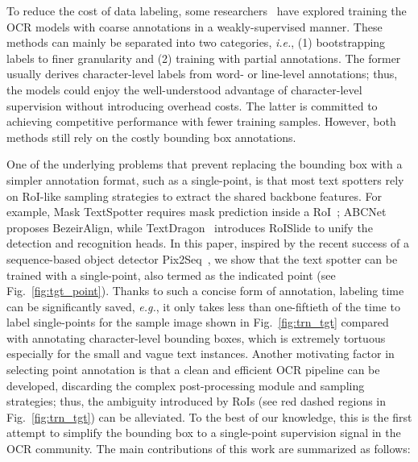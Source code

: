 \documentclass[sigconf]{acmart}
\begin{document}
To reduce the cost of data labeling, some researchers~\cite{tian2017wetext, bartz2018see, hu2017wordsup, baek2019character} have explored training the OCR models with coarse annotations in a weakly-supervised manner. These methods can mainly be separated into two categories, \emph{i.e.}, (1) bootstrapping labels to finer granularity and (2) training with partial annotations. The former usually derives character-level labels from word- or line-level annotations; thus, the models could enjoy the well-understood advantage of character-level supervision without introducing overhead costs. The latter is committed to achieving competitive performance with fewer training samples. However, both methods still rely on the costly bounding box annotations.

One of the underlying problems that prevent replacing the bounding box with a simpler annotation format, such as a single-point, is that most text spotters rely on RoI-like sampling strategies to extract the shared backbone features. For example, Mask TextSpotter requires mask prediction inside a RoI~\cite{liao2020masktext}; ABCNet~\cite{liu2020abcnet} proposes BezeirAlign, while TextDragon~\cite{feng2019textdragon} introduces RoISlide to unify the detection and recognition heads. In this paper, inspired by the recent success of a sequence-based object detector Pix2Seq~\cite{chen2021pix2seq}, we show that the text spotter can be trained with a single-point, also termed as the indicated point (see Fig.~\ref{fig:tgt_point}). Thanks to such a concise form of annotation, labeling time can be significantly saved, \emph{e.g.}, it only takes less than one-fiftieth of the time to label single-points for the sample image shown in Fig.~\ref{fig:trn_tgt} compared with annotating character-level bounding boxes, which is extremely tortuous especially for the small and vague text instances. Another motivating factor in selecting point annotation is that a clean and efficient OCR pipeline can be developed, discarding the complex post-processing module and sampling strategies; thus, the ambiguity introduced by RoIs (see red dashed regions in Fig.~\ref{fig:trn_tgt}) can be alleviated.
To the best of our knowledge, this is the first attempt to simplify the bounding box to a single-point supervision signal in the OCR community. The main contributions of this work are summarized as follows:
\end{document}
